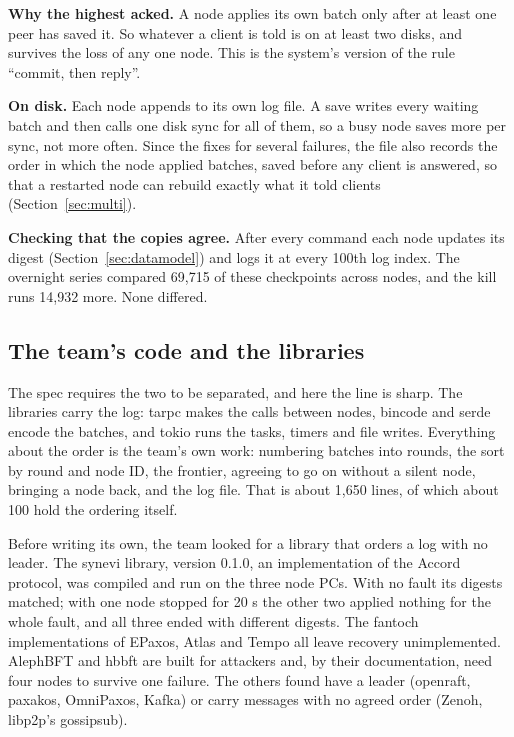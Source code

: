 \textbf{Why the highest acked.} A node applies its own batch only after at least one peer has saved it. So whatever a client is told is on at least two disks, and survives the loss of any one node. This is the system's version of the rule ``commit, then reply''.

\textbf{On disk.} Each node appends to its own log file. A save writes every waiting batch and then calls one disk sync for all of them, so a busy node saves more per sync, not more often. Since the fixes for several failures, the file also records the order in which the node applied batches, saved before any client is answered, so that a restarted node can rebuild exactly what it told clients (Section~\ref{sec:multi}).

\textbf{Checking that the copies agree.} After every command each node updates its digest (Section~\ref{sec:datamodel}) and logs it at every 100th log index. The overnight series compared 69,715 of these checkpoints across nodes, and the kill runs 14,932 more. None differed.

\subsection{The team's code and the libraries}

The spec requires the two to be separated, and here the line is sharp. The libraries carry the log: tarpc makes the calls between nodes, bincode and serde encode the batches, and tokio runs the tasks, timers and file writes. Everything about the order is the team's own work: numbering batches into rounds, the sort by round and node ID, the frontier, agreeing to go on without a silent node, bringing a node back, and the log file. That is about 1,650 lines, of which about 100 hold the ordering itself.

Before writing its own, the team looked for a library that orders a log with no leader. The synevi library, version 0.1.0, an implementation of the Accord protocol, was compiled and run on the three node PCs. With no fault its digests matched; with one node stopped for 20 s the other two applied nothing for the whole fault, and all three ended with different digests. The fantoch implementations of EPaxos, Atlas and Tempo all leave recovery unimplemented. AlephBFT and hbbft are built for attackers and, by their documentation, need four nodes to survive one failure. The others found have a leader (openraft, paxakos, OmniPaxos, Kafka) or carry messages with no agreed order (Zenoh, libp2p's gossipsub). 
